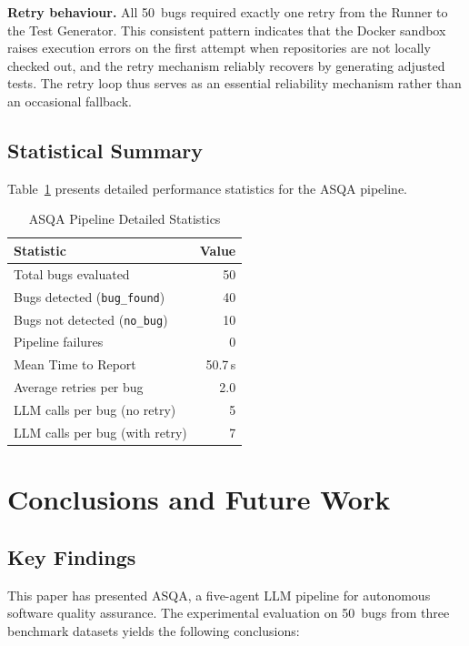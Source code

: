 \documentclass[conference]{IEEEtran}
\begin{document}
\textbf{Retry behaviour.} All 50~bugs required exactly one retry from the Runner to the Test Generator. This consistent pattern indicates that the Docker sandbox raises execution errors on the first attempt when repositories are not locally checked out, and the retry mechanism reliably recovers by generating adjusted tests. The retry loop thus serves as an essential reliability mechanism rather than an occasional fallback.

\subsection{Statistical Summary}

Table~\ref{tab:detailed} presents detailed performance statistics for the ASQA pipeline.

\begin{table}[htbp]
\caption{ASQA Pipeline Detailed Statistics}
\label{tab:detailed}
\centering
\begin{tabular}{lr}
\toprule
\textbf{Statistic} & \textbf{Value} \\
\midrule
Total bugs evaluated & 50 \\
Bugs detected (\texttt{bug\_found}) & 40 \\
Bugs not detected (\texttt{no\_bug}) & 10 \\
Pipeline failures & 0 \\
Mean Time to Report & 50.7\,s \\
Average retries per bug & 2.0 \\
LLM calls per bug (no retry) & 5 \\
LLM calls per bug (with retry) & 7 \\
\bottomrule
\end{tabular}
\end{table}

\section{Conclusions and Future Work}

\subsection{Key Findings}

This paper has presented ASQA, a five-agent LLM pipeline for autonomous software quality assurance. The experimental evaluation on 50~bugs from three benchmark datasets yields the following conclusions:
\end{document}
